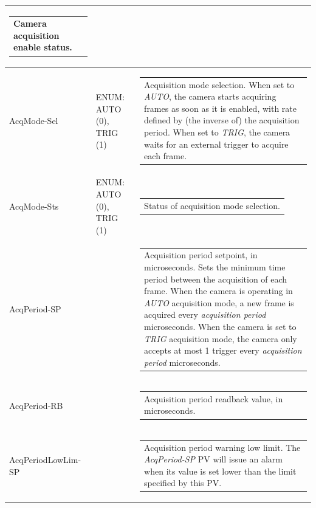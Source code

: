 \documentclass[openany]{article}
\begin{document}
\begin{longtable}{| m{3.0cm} m{4.5cm} m{7.0cm} |}
\begin{tabular}{@{}m{6cm}@{}}
                Camera acquisition enable status.
            \end{tabular} \hypertarget{pv:acq-mode}{}\\ \hline
        AcqMode-Sel & ENUM: AUTO (0), TRIG (1) & \begin{tabular}{@{}m{6cm}@{}}
                Acquisition mode selection. When set to \emph{AUTO}, the camera
                starts acquiring frames as soon as it is enabled, with rate defined
                by (the inverse of) the acquisition period. When set to \emph{TRIG},
                the camera waits for an external trigger to acquire each frame.
            \end{tabular} \\ \hline
        AcqMode-Sts & ENUM: AUTO (0), TRIG (1) & \begin{tabular}{@{}m{6cm}@{}}
                Status of acquisition mode selection.
            \end{tabular} \hypertarget{pv:acq-period}{}\\ \hline
        AcqPeriod-SP &  & \begin{tabular}{@{}m{6cm}@{}}
                Acquisition period setpoint, in microseconds. Sets the minimum time period
                between the acquisition of each frame. When the camera is operating in 
                \emph{AUTO} acquisition mode, a new frame is acquired every 
                \emph{acquisition period} microseconds. When the camera is set to
                \emph{TRIG} acquisition mode, the camera only accepts at most 1
                trigger every \emph{acquisition period} microseconds.
            \end{tabular} \\ \hline
        AcqPeriod-RB &  & \begin{tabular}{@{}m{6cm}@{}}
                Acquisition period readback value, in microseconds.
            \end{tabular} \hypertarget{pv:acq-period-lim}{}\\ \hline
        AcqPeriodLowLim-SP &  & \begin{tabular}{@{}m{6cm}@{}}
                Acquisition period warning low limit. The \emph{AcqPeriod-SP} PV will
                issue an alarm when its value is set lower than the limit specified by
                this PV.
            \end{tabular} \\ \hline

\end{longtable}
\end{document}
